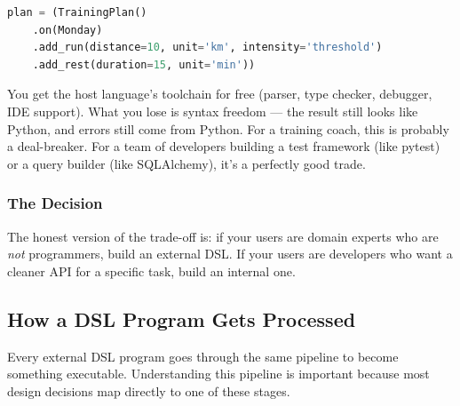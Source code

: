 \begin{lstlisting}[language=Python]
plan = (TrainingPlan()
    .on(Monday)
    .add_run(distance=10, unit='km', intensity='threshold')
    .add_rest(duration=15, unit='min'))
\end{lstlisting}

You get the host language's toolchain for free (parser, type checker, debugger, IDE
support). What you lose is syntax freedom --- the result still looks like Python, and
errors still come from Python. For a training coach, this is probably a deal-breaker.
For a team of developers building a test framework (like pytest) or a query builder
(like SQLAlchemy), it's a perfectly good trade.

\subsubsection{The Decision}

The honest version of the trade-off is: if your users are domain experts who are
\emph{not} programmers, build an external DSL. If your users are developers who want
a cleaner API for a specific task, build an internal one.

\begin{center}
\end{center}

\subsection{How a DSL Program Gets Processed}

Every external DSL program goes through the same pipeline to become something executable.
Understanding this pipeline is important because most design decisions map directly to
one of these stages.


